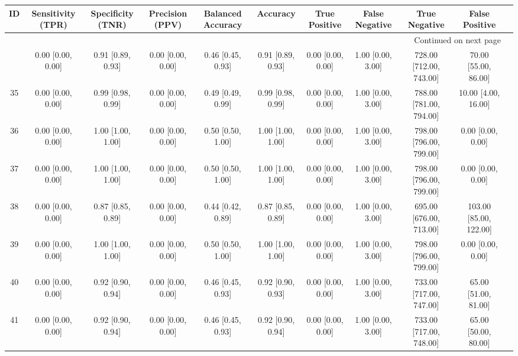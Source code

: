 \documentclass[8pt]{article}
\begin{document}
\begin{center}
\begin{footnotesize}
\begin{longtable}{|ccccccccccc|}
\toprule
 ID &  Sensitivity (TPR) &  Specificity (TNR) &    Precision (PPV) &  Balanced Accuracy &           Accuracy &      True Positive &     False Negative &            True Negative &          False Positive \\
\midrule
\endhead
\midrule
\multicolumn{10}{r}{{Continued on next page}} \\
\midrule
\endfoot

\bottomrule
\endlastfoot
 33 &  0.00 [0.00, 0.00] &  0.91 [0.89, 0.93] &  0.00 [0.00, 0.00] &  0.46 [0.45, 0.93] &  0.91 [0.89, 0.93] &  0.00 [0.00, 0.00] &  1.00 [0.00, 3.00] &  728.00 [712.00, 743.00] &    70.00 [55.00, 86.00] \\
 35 &  0.00 [0.00, 0.00] &  0.99 [0.98, 0.99] &  0.00 [0.00, 0.00] &  0.49 [0.49, 0.99] &  0.99 [0.98, 0.99] &  0.00 [0.00, 0.00] &  1.00 [0.00, 3.00] &  788.00 [781.00, 794.00] &     10.00 [4.00, 16.00] \\
 36 &  0.00 [0.00, 0.00] &  1.00 [1.00, 1.00] &  0.00 [0.00, 0.00] &  0.50 [0.50, 1.00] &  1.00 [1.00, 1.00] &  0.00 [0.00, 0.00] &  1.00 [0.00, 3.00] &  798.00 [796.00, 799.00] &       0.00 [0.00, 0.00] \\
 37 &  0.00 [0.00, 0.00] &  1.00 [1.00, 1.00] &  0.00 [0.00, 0.00] &  0.50 [0.50, 1.00] &  1.00 [1.00, 1.00] &  0.00 [0.00, 0.00] &  1.00 [0.00, 3.00] &  798.00 [796.00, 799.00] &       0.00 [0.00, 0.00] \\
 38 &  0.00 [0.00, 0.00] &  0.87 [0.85, 0.89] &  0.00 [0.00, 0.00] &  0.44 [0.42, 0.89] &  0.87 [0.85, 0.89] &  0.00 [0.00, 0.00] &  1.00 [0.00, 3.00] &  695.00 [676.00, 713.00] &  103.00 [85.00, 122.00] \\
 39 &  0.00 [0.00, 0.00] &  1.00 [1.00, 1.00] &  0.00 [0.00, 0.00] &  0.50 [0.50, 1.00] &  1.00 [1.00, 1.00] &  0.00 [0.00, 0.00] &  1.00 [0.00, 3.00] &  798.00 [796.00, 799.00] &       0.00 [0.00, 0.00] \\
 40 &  0.00 [0.00, 0.00] &  0.92 [0.90, 0.94] &  0.00 [0.00, 0.00] &  0.46 [0.45, 0.93] &  0.92 [0.90, 0.93] &  0.00 [0.00, 0.00] &  1.00 [0.00, 3.00] &  733.00 [717.00, 747.00] &    65.00 [51.00, 81.00] \\
 41 &  0.00 [0.00, 0.00] &  0.92 [0.90, 0.94] &  0.00 [0.00, 0.00] &  0.46 [0.45, 0.93] &  0.92 [0.90, 0.94] &  0.00 [0.00, 0.00] &  1.00 [0.00, 3.00] &  733.00 [717.00, 748.00] &    65.00 [50.00, 80.00] \\

\end{longtable}
\end{footnotesize}
\end{center}
\end{document}
